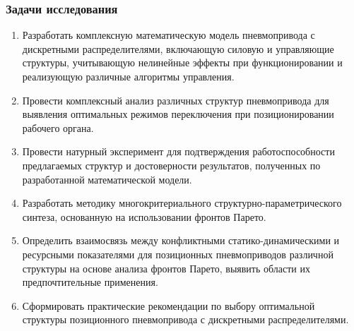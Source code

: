 \begin{frame}
	\frametitle{Задачи исследования}
	\begin{enumerate}
	\item \scriptsize Разработать комплексную математическую модель пневмопривода с дискретными распределителями,
	      включающую силовую и управляющие структуры, учитывающую нелинейные эффекты
	      при функционировании и реализующую различные алгоритмы управления.

	\item \scriptsize Провести комплексный анализ различных структур пневмопривода для выявления оптимальных
	      режимов переключения при позиционировании рабочего органа.

	\item \scriptsize Провести натурный эксперимент для подтверждения работоспособности предлагаемых структур
	      и достоверности результатов, полученных по разработанной математической модели.

	\item \scriptsize Разработать методику многокритериального структурно-\allowbreak па\-ра\-ме\-три\-че\-ско\-го
	      синтеза, основанную на использовании фронтов Парето.

	\item \scriptsize Определить взаимосвязь между конфликтными статико-динамическими и ресурсными
	      показателями для позиционных пневмоприводов различной структуры на
	      основе анализа фронтов Парето, выявить области их предпочтительные применения.

	\item \scriptsize Сформировать практические рекомендации по выбору оптимальной структуры
	      позиционного пневмопривода с дискретными распределителями.

	\end{enumerate}
\end{frame}
